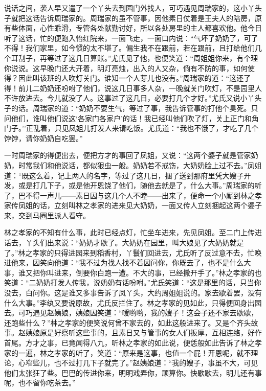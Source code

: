 说话之间，袭人早又遣了一个丫头去到园门外找人，可巧遇见周瑞家的，这小丫头子就把这话告诉周瑞家的。周瑞家的虽不管事，因他素日仗着是王夫人的陪房，原有些体面，心性乖滑，专管各处献勤讨好，所以各处房里的主人都喜欢他。他今日听了这话，忙的便跑入怡红院来，一面飞走，一面口内说：``气坏了奶奶了，可了不得！我们家里，如今惯的太不堪了。偏生我不在跟前，若在跟前，且打给他们几个耳刮子，再等过了这几日算账。''尤氏见了他，也便笑道：``周姐姐你来，有个理你说说。这早晚门还大开着，明灯亮烛，出入的人又杂，倘有不防的事，如何使得？因此叫该班的人吹灯关门。谁知一个人芽儿也没有。''周瑞家的道：``这还了得！前儿二奶奶还吩咐了他们，说这几日事多人杂，一晚就关门吹灯，不是园里人不许放进去。今儿就没了人。这事过了这几日，必要打几个才好。''尤氏又说小丫头子的话。周瑞家的道：``奶奶不要生气，等过了事，我告诉管事的打他个臭死。只问他们，谁叫他们说这`各家门各家户'的话！我已经叫他们吹了灯，关上正门和角门子。''正乱着，只见凤姐儿打发人来请吃饭。尤氏道：``我也不饿了，才吃了几个饽饽，请你奶奶自吃罢。''

一时周瑞家的得便出去，便把方才的事回了凤姐，又说：``这两个婆子就是管家奶奶，时常我们和他说话，都似狠虫一般。奶奶若不戒饬，大奶奶脸上过不去。''凤姐道：``既这么着，记上两人的名字，等过了这几日，捆了送到那府里凭大嫂子开发，或是打几下子，或是他开恩饶了他们，随他去就是了，什么大事。''周瑞家的听了，巴不得一声儿------素日因与这几个人不睦------出来了，便命一个小厮到林之孝家传凤姐的话，立刻叫林之孝家的进来见大奶奶，一面又传人立刻捆起这两个婆子来，交到马圈里派人看守。

林之孝家的不知有什么事，此时已经点灯，忙坐车进来，先见凤姐。至二门上传进话去，丫头们出来说：``奶奶才歇了。大奶奶在园里，叫大娘见了大奶奶就是了。''林之孝家的只得进园来到稻香村，丫鬟们回进去，尤氏听了反过意不去，忙唤进他来，因笑向他道：``我不过为找人找不着因问你，你既去了，也不是什么大事，谁又把你叫进来，倒要你白跑一遭。不大的事，已经撒开手了。''林之孝家的也笑道：``二奶奶打发人传我，说奶奶有话吩咐。''尤氏笑道：``这是那里的话，只当你没去，白问你。这是谁又多事告诉了凤丫头，大约周姐姐说的。家去歇着罢，没有什么大事。''李纨又要说原故，尤氏反拦住了。林之孝家的见如此，只得便回身出园去。可巧遇见赵姨娘，姨娘因笑道：``嗳哟哟，我的嫂子！这会子还不家去歇歇，还跑些什么？''林之孝家的便笑说何曾不家去的，如此这般进来了。又是个齐头故事。赵姨娘原是好察听这些事的，且素日又与管事的女人们扳厚，互相连络，好作首尾。方才之事，已竟闻得八九，听林之孝家的如此说，便恁般如此告诉了林之孝家的一遍，林之孝家的听了，笑道：``原来是这事，也值一个屁！开恩呢，就不理论，心窄些儿，也不过打几下子就完了。''赵姨娘道：``我的嫂子，事虽不大，可见他们太张狂了些。巴巴的传进你来，明明戏弄你，顽算你。快歇歇去，明儿还有事呢，也不留你吃茶去。''

